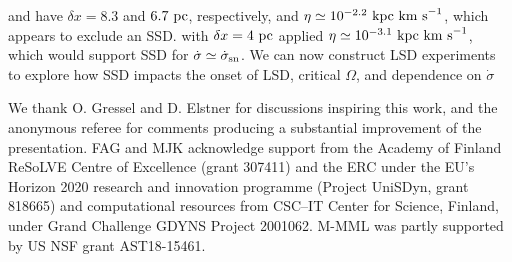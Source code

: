 \documentclass[preprint2]{aastex63}
\newcommand\SNr{\dot\sigma_{\rm sn}}
\newcommand\OSN{\Omega_{\rm sn}}
\newcommand\kpc{~ {\rm kpc}}
\newcommand\pc{~ {\rm pc}}
\newcommand\dx{ {\delta x}}
\newcommand\kms{~ {\rm km~ s}^{-1}}
\newcommand{\fg}[1]{\textcolor{midgreen}{#1}}
\begin{document}
 \citet{Gressel:2008} and \citet{GE20} have $\dx=8.3$ and $6.7\pc$,
 respectively, and $\eta\simeq10^{-2.2}\kpc\kms$, which appears to exclude
 an SSD.
 \citet{Gent:2013a} with $\dx=4\pc$ applied $\eta\simeq10^{-3.1}\kpc\kms$,
 which would support SSD for $\dot\sigma\simeq\SNr$.
 \fg{We can now construct LSD experiments to explore how SSD impacts the 
onset of LSD, critical $\Omega$, and dependence on $\dot\sigma$%
}   

\acknowledgments
\fg{We thank O. Gressel \fg{and D. Elstner} for discussions inspiring this work, and the
  anonymous referee for comments producing a substantial
  improvement of the presentation.}
FAG and MJK acknowledge support from the Academy of Finland
ReSoLVE Centre of Excellence (grant 307411) and the ERC
under the EU's Horizon 2020 research and innovation
programme (Project UniSDyn, grant 818665) and computational
resources from CSC–IT Center for Science, Finland, under Grand
Challenge GDYNS Project 2001062. 
M-MML was partly supported by US NSF grant AST18-15461.

\end{document}
